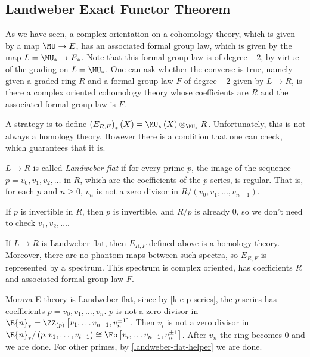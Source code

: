 


\subsection{Landweber Exact Functor Theorem}

As we have seen, a complex orientation on a cohomology theory, which is given by a map $\MU \to E$, has an associated formal group law, which is given by the map $L = \MU_* \to E_*$.
Note that this formal group law is of degree $-2$, by virtue of the grading on $L = \MU_*$.
One can ask whether the converse is true, namely given a graded ring $R$ and a formal group law $F$ of degree $-2$ given by $L \to R$, is there a complex oriented cohomology theory whose coefficients are $R$ and the associated formal group law is $F$.

A strategy is to define $\left(E_{R,F}\right)_*\left(X\right) = \MU_*\left(X\right) \otimes_{\MU_*} R$.
Unfortunately, this is not always a homology theory.
However there is a condition that one can check, which guarantees that it is.

\begin{definition}
	$L \to R$ is called \emph{Landweber flat} if for every prime $p$, the image of the sequence $p = v_0, v_1, v_2, \dotsc$ in $R$, which are the coefficients of the $p$-series, is regular.
	That is, for each $p$ and $n \geq 0$, $v_n$ is not a zero divisor in $R/\left(v_0, v_1, \dotsc, v_{n-1}\right)$.
\end{definition}

\begin{remark}\label{landweber-flat-helper}
	If $p$ is invertible in $R$, then $p$ is invertible, and $R/p$ is already $0$, so we don't need to check $v_1, v_2, \dotsc$.
\end{remark}

\begin{theorem}\label{LEFT}
	If $L \to R$ is Landweber flat, then $E_{R,F}$ defined above is a homology theory.
	Moreover, there are no phantom maps between such spectra, so $E_{R,F}$ is represented by a spectrum.
	This spectrum is complex oriented, has coefficients $R$ and associated formal group law $F$.
\end{theorem}

\begin{example}
	Morava E-theory is Landweber flat, since by \ref{k-e-p-series}, the $p$-series has coefficients $p = v_0, v_1, \dotsc, v_n$.
	$p$ is not a zero divisor in $\E{n}_* = \ZZ_{\left(p\right)}\left[v_1, \dotsc v_{n-1}, v_n^{\pm 1}\right]$.
	Then $v_i$ is not a zero divisor in $\E{n}_*/\left(p, v_1, \dotsc, v_{i-1}\right) \cong \Fp\left[v_i, \dotsc v_{n-1}, v_n^{\pm 1}\right]$.
	After $v_n$ the ring becomes $0$ and we are done.
	For other primes, by \ref{landweber-flat-helper} we are done.
\end{example}

